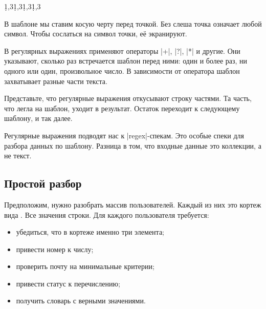 
\begin{english}
  \begin{text}
\d{1,3}\.\d{1,3}\.\d{1,3}\.\d{1,3}
  \end{text}
\end{english}

В шаблоне мы ставим косую черту перед точкой. Без слеша точка означает любой
символ. Чтобы сослаться на символ точки, е\"{е} экранируют.

В регулярных выражениях применяют операторы \spverb|+|, \spverb|?|, \spverb|*| и
другие. Они указывают, сколько раз встречается шаблон перед ними: один и более
раз, ни одного или один, произвольное число. В зависимости от оператора шаблон
захватывает разные части текста.

Представьте, что регулярные выражения откусывают строку частями. Та часть, что
легла на шаблон, уходит в результат. Остаток переходит к следующему шаблону, и
так далее.

Регулярные выражения подводят нас к \spverb|regex|-спекам. Это особые спеки для
разбора данных по шаблону. Разница в том, что входные данные это коллекции, а не
текст.


\subsection{Простой разбор}

Предположим, нужно разобрать массив пользователей. Каждый из них это кортеж вида
. Все значения строки. Для каждого пользователя
требуется:

\begin{itemize}

\item
  убедиться, что в кортеже именно три элемента;

\item
  привести номер к числу;

\item
  проверить почту на минимальные критерии;

\item
  привести статус к перечислению;

\item
  получить словарь с верными значениями.

\end{itemize}

